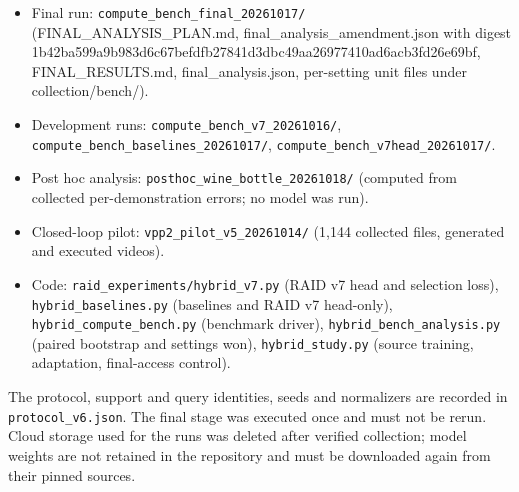 \documentclass[11pt,a4paper]{article}
\providecommand{\tightlist}{\setlength{\itemsep}{0pt}\setlength{\parskip}{0pt}}
\begin{document}
\begin{itemize}
\tightlist
\item
  Final run: \texttt{compute\_bench\_final\_20261017/} (FINAL\_ANALYSIS\_PLAN.md, final\_analysis\_amendment.json with digest 1b42ba599a9b983d6c67befdfb27841d3dbc49aa26977410ad6acb3fd26e69bf, FINAL\_RESULTS.md, final\_analysis.json, per-setting unit files under collection/bench/).
\item
  Development runs: \texttt{compute\_bench\_v7\_20261016/}, \texttt{compute\_bench\_baselines\_20261017/}, \texttt{compute\_bench\_v7head\_20261017/}.
\item
  Post hoc analysis: \texttt{posthoc\_wine\_bottle\_20261018/} (computed from collected per-demonstration errors; no model was run).
\item
  Closed-loop pilot: \texttt{vpp2\_pilot\_v5\_20261014/} (1,144 collected files, generated and executed videos).
\item
  Code: \texttt{raid\_experiments/hybrid\_v7.py} (RAID v7 head and selection loss), \texttt{hybrid\_baselines.py} (baselines and RAID v7 head-only), \texttt{hybrid\_compute\_bench.py} (benchmark driver), \texttt{hybrid\_bench\_analysis.py} (paired bootstrap and settings won), \texttt{hybrid\_study.py} (source training, adaptation, final-access control).
\end{itemize}

The protocol, support and query identities, seeds and normalizers are recorded in \texttt{protocol\_v6.json}. The final stage was executed once and must not be rerun. Cloud storage used for the runs was deleted after verified collection; model weights are not retained in the repository and must be downloaded again from their pinned sources.
\end{document}
